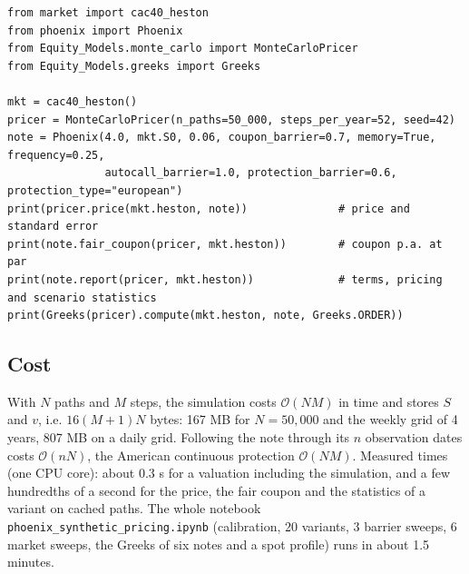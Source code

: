 \documentclass[11pt,a4paper]{article}
\newcommand{\code}[1]{\texttt{#1}}
\begin{document}
\begin{lstlisting}
from market import cac40_heston
from phoenix import Phoenix
from Equity_Models.monte_carlo import MonteCarloPricer
from Equity_Models.greeks import Greeks

mkt = cac40_heston()
pricer = MonteCarloPricer(n_paths=50_000, steps_per_year=52, seed=42)
note = Phoenix(4.0, mkt.S0, 0.06, coupon_barrier=0.7, memory=True, frequency=0.25,
               autocall_barrier=1.0, protection_barrier=0.6, protection_type="european")
print(pricer.price(mkt.heston, note))              # price and standard error
print(note.fair_coupon(pricer, mkt.heston))        # coupon p.a. at par
print(note.report(pricer, mkt.heston))             # terms, pricing and scenario statistics
print(Greeks(pricer).compute(mkt.heston, note, Greeks.ORDER))
\end{lstlisting}

\subsection{Cost}
With $N$ paths and $M$ steps, the simulation costs $\mathcal{O}(NM)$ in time and stores $S$ and $v$, i.e.
$16(M+1)N$ bytes: 167 MB for $N = 50{,}000$ and the weekly grid of 4 years, 807 MB on a daily grid. Following the
note through its $n$ observation dates costs $\mathcal{O}(nN)$, the American continuous protection
$\mathcal{O}(NM)$. Measured times (one CPU core): about 0.3 s for a valuation including the simulation, and a few hundredths of
a second for the price, the fair coupon and the statistics of a variant on cached paths. The whole notebook
\code{phoenix\_synthetic\_pricing.ipynb} (calibration, 20 variants, 3 barrier sweeps, 6 market sweeps, the Greeks of
six notes and a spot profile) runs in about 1.5 minutes.

\end{document}

